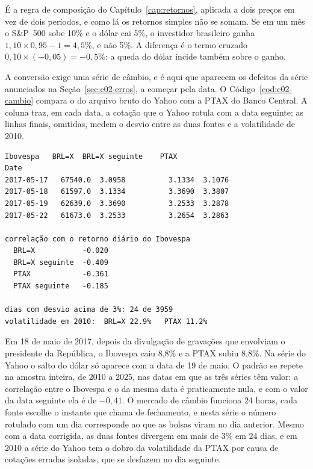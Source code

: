 É a regra de composição do Capítulo~\ref{cap:retornos}, aplicada a dois preços em vez de dois períodos, e como lá os retornos simples não se somam. Se em um mês o S\&P~500 sobe 10\% e o dólar cai 5\%, o investidor brasileiro ganha $1,10 \times 0,95 - 1 = 4,5\%$, e não 5\%. A diferença é o termo cruzado $0,10 \times (-0,05) = -0,5\%$: a queda do dólar incide também sobre o ganho.

A conversão exige uma série de câmbio, e é aqui que aparecem os defeitos da série  anunciados na Seção~\ref{sec:c02-erros}, a começar pela data. O Código~\ref{cod:c02-cambio} compara o  do arquivo bruto do Yahoo com a PTAX do Banco Central. A coluna  traz, em cada data, a cotação que o Yahoo rotula com a data seguinte; as linhas finais, omitidas, medem o desvio entre as duas fontes e a volatilidade de 2010.


\begin{lstlisting}[style=saida]
            Ibovespa   BRL=X  BRL=X seguinte    PTAX
Date
2017-05-17   67540.0  3.0958          3.1334  3.1076
2017-05-18   61597.0  3.1334          3.3690  3.3807
2017-05-19   62639.0  3.3690          3.2533  3.2878
2017-05-22   61673.0  3.2533          3.2654  3.2863

correlação com o retorno diário do Ibovespa
  BRL=X           -0.020
  BRL=X seguinte  -0.409
  PTAX            -0.361
  PTAX seguinte   -0.185

dias com desvio acima de 3%: 24 de 3959
volatilidade em 2010:  BRL=X 22.9%   PTAX 11.2%
\end{lstlisting}

Em 18 de maio de 2017, depois da divulgação de gravações que envolviam o presidente da República, o Ibovespa caiu 8,8\% e a PTAX subiu 8,8\%. Na série do Yahoo o salto do dólar só aparece com a data de 19 de maio. O padrão se repete na amostra inteira, de 2010 a 2025, nas datas em que as três séries têm valor: a correlação entre o Ibovespa e o  da mesma data é praticamente nula, e com o valor da data seguinte ela é de $-0,41$. O mercado de câmbio funciona 24 horas, cada fonte escolhe o instante que chama de fechamento, e nesta série o número rotulado com um dia corresponde ao que as bolsas viram no dia anterior. Mesmo com a data corrigida, as duas fontes divergem em mais de 3\% em 24 dias, e em 2010 a série do Yahoo tem o dobro da volatilidade da PTAX por causa de cotações erradas isoladas, que se desfazem no dia seguinte.

